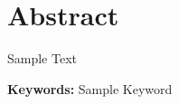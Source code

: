 \thispagestyle{empty}
\section*{Abstract}
Sample Text
\begin{flushleft}
  \textbf{Keywords:} Sample Keyword
\end{flushleft}
